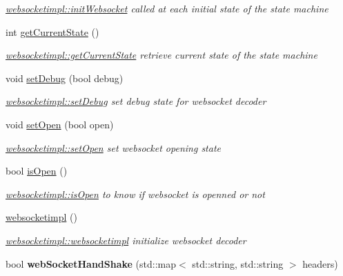 \begin{DoxyCompactItemize}
\begin{DoxyCompactList}\small\item\em \hyperlink{classwebsocketimpl_a67fa07befa5af268b8f035ae4d33cd55}{websocketimpl\-::init\-Websocket} called at each initial state of the state machine \end{DoxyCompactList}\item 
int \hyperlink{classwebsocketimpl_ad2c9ac95e4498257c9d19bca9f509777}{get\-Current\-State} ()
\begin{DoxyCompactList}\small\item\em \hyperlink{classwebsocketimpl_ad2c9ac95e4498257c9d19bca9f509777}{websocketimpl\-::get\-Current\-State} retrieve current state of the state machine \end{DoxyCompactList}\item 
void \hyperlink{classwebsocketimpl_a237efd210f7648c903f3044c1a8ff0c9}{set\-Debug} (bool debug)
\begin{DoxyCompactList}\small\item\em \hyperlink{classwebsocketimpl_a237efd210f7648c903f3044c1a8ff0c9}{websocketimpl\-::set\-Debug} set debug state for websocket decoder \end{DoxyCompactList}\item 
void \hyperlink{classwebsocketimpl_a6218fa898318685fc634da3931a6a879}{set\-Open} (bool open)
\begin{DoxyCompactList}\small\item\em \hyperlink{classwebsocketimpl_a6218fa898318685fc634da3931a6a879}{websocketimpl\-::set\-Open} set websocket opening state \end{DoxyCompactList}\item 
bool \hyperlink{classwebsocketimpl_a19c16ec206b8ca8f61720355defb65bc}{is\-Open} ()
\begin{DoxyCompactList}\small\item\em \hyperlink{classwebsocketimpl_a19c16ec206b8ca8f61720355defb65bc}{websocketimpl\-::is\-Open} to know if websocket is openned or not \end{DoxyCompactList}\item 
\hypertarget{classwebsocketimpl_a8d0888448cc98685c7f941fbe447ecd0}{\hyperlink{classwebsocketimpl_a8d0888448cc98685c7f941fbe447ecd0}{websocketimpl} ()}\label{classwebsocketimpl_a8d0888448cc98685c7f941fbe447ecd0}

\begin{DoxyCompactList}\small\item\em \hyperlink{classwebsocketimpl_a8d0888448cc98685c7f941fbe447ecd0}{websocketimpl\-::websocketimpl} initialize websocket decoder \end{DoxyCompactList}\item 
\hypertarget{classwebsocketimpl_a97a91164ff71d904b908f6c425c7c521}{bool {\bfseries web\-Socket\-Hand\-Shake} (std\-::map$<$ std\-::string, std\-::string $>$ headers)}\label{classwebsocketimpl_a97a91164ff71d904b908f6c425c7c521}


\end{DoxyCompactItemize}
